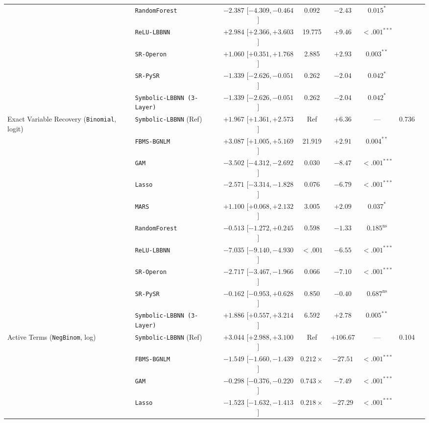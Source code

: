 \begin{table}[htbp]
{{\begin{tabular}{llcccccc}
 & \texttt{RandomForest} & $-2.387$ [$-4.309, -0.464$] & 0.092 & $-2.43$ & $0.015^{*}$ &  \\
 & \texttt{ReLU-LBBNN} & $+2.984$ [$+2.366, +3.603$] & 19.775 & $+9.46$ & $<.001^{***}$ &  \\
 & \texttt{SR-Operon} & $+1.060$ [$+0.351, +1.768$] & 2.885 & $+2.93$ & $0.003^{**}$ &  \\
 & \texttt{SR-PySR} & $-1.339$ [$-2.626, -0.051$] & 0.262 & $-2.04$ & $0.042^{*}$ &  \\
 & \texttt{Symbolic-LBBNN (3-Layer)} & $-1.339$ [$-2.626, -0.051$] & 0.262 & $-2.04$ & $0.042^{*}$ &  \\
\midrule
Exact Variable Recovery (\texttt{Binomial}, logit) & \texttt{Symbolic-LBBNN} (Ref) & $+1.967$ [$+1.361, +2.573$] & Ref & $+6.36$ & --- & 0.736 \\
 & \texttt{FBMS-BGNLM} & $+3.087$ [$+1.005, +5.169$] & 21.919 & $+2.91$ & $0.004^{**}$ &  \\
 & \texttt{GAM} & $-3.502$ [$-4.312, -2.692$] & 0.030 & $-8.47$ & $<.001^{***}$ &  \\
 & \texttt{Lasso} & $-2.571$ [$-3.314, -1.828$] & 0.076 & $-6.79$ & $<.001^{***}$ &  \\
 & \texttt{MARS} & $+1.100$ [$+0.068, +2.132$] & 3.005 & $+2.09$ & $0.037^{*}$ &  \\
 & \texttt{RandomForest} & $-0.513$ [$-1.272, +0.245$] & 0.598 & $-1.33$ & $0.185^{\text{ns}}$ &  \\
 & \texttt{ReLU-LBBNN} & $-7.035$ [$-9.140, -4.930$] & $<.001$ & $-6.55$ & $<.001^{***}$ &  \\
 & \texttt{SR-Operon} & $-2.717$ [$-3.467, -1.966$] & 0.066 & $-7.10$ & $<.001^{***}$ &  \\
 & \texttt{SR-PySR} & $-0.162$ [$-0.953, +0.628$] & 0.850 & $-0.40$ & $0.687^{\text{ns}}$ &  \\
 & \texttt{Symbolic-LBBNN (3-Layer)} & $+1.886$ [$+0.557, +3.214$] & 6.592 & $+2.78$ & $0.005^{**}$ &  \\
\midrule
Active Terms (\texttt{NegBinom}, log) & \texttt{Symbolic-LBBNN} (Ref) & $+3.044$ [$+2.988, +3.100$] & Ref & $+106.67$ & --- & 0.104 \\
 & \texttt{FBMS-BGNLM} & $-1.549$ [$-1.660, -1.439$] & $0.212\times$ & $-27.51$ & $<.001^{***}$ &  \\
 & \texttt{GAM} & $-0.298$ [$-0.376, -0.220$] & $0.743\times$ & $-7.49$ & $<.001^{***}$ &  \\
 & \texttt{Lasso} & $-1.523$ [$-1.632, -1.413$] & $0.218\times$ & $-27.29$ & $<.001^{***}$ &  \\

\end{tabular}}}
\end{table}
